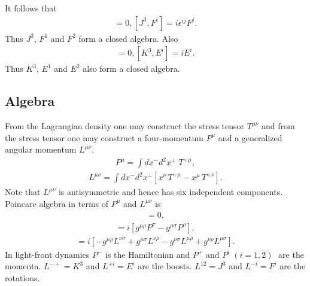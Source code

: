 \documentclass[12pt,a4paper]{report}
\begin{document}
It follows that
\begin{align}
    [ F^{1}, F^{2} ] = 0  , [J^{3},F^{i}] = i \epsilon^{ij} F^{j}  .
\end{align}
Thus $J^3$, $F^1$ and $F^2$ form a closed algebra. Also
\begin{align}
    [E^1,E^2]=0, [K^3,E^i] = i E^i.
\end{align}
Thus $K^3$, $E^1$ and $E^2$ also form a closed algebra.

\subsection{Algebra}
From the Lagrangian density one may construct the stress tensor $T^{\mu \nu}$ 
and from the
stress tensor one may construct a four-momentum $P^{\mu}$ and a generalized
angular momentum $L^{\mu \nu}$. \cite{Harindranath, Chang}
\begin{align}
P^{\mu} =  \int dx^{-} d^{2}x^{\perp} \; T^{+ \mu}  ,
\end{align}
 \begin{align}
 L^{\mu \nu} =  \int dx^{-} d^{2}x^{\perp} [ x^{\nu} \, T^{+\mu}
- x^{\mu} \, T^{+\nu} ]  . 
\end{align}
Note that $L^{\mu \nu}$ is antisymmetric and hence has six independent
components. 
Poincare algebra in terms of $P^{\mu}$ and $L^{\mu \nu}$ is 
\begin{align}
[ P^{\mu} , P^{\nu}] = 0  , 
\end{align}
\begin{align}
[ P^{\mu} , L^{\rho \sigma} ] = i [ g^{\mu \rho } P^{\sigma} 
- g^{\mu \sigma} P^{\rho}]  , 
\end{align}
\begin{align}
[ L^{\mu \nu} , L^{\rho \sigma}] = i [ - g^{\mu \rho} L^{\nu \sigma} +
g^{\mu \sigma} L^{\nu \rho}- g^{\nu \sigma} L^{\mu \rho} + g^{\nu \rho} L^{\mu
\sigma} ]  . 
\end{align}
\bigskip
In light-front dynamics $P^{-} $ is the Hamiltonian and $P^{+}$ and 
$P^{i} \; (i=1,2) \; $ 
\vspace{-0.3truecm}
are the momenta. $L^{-+} = K^{3}$ and $L^{+i} = E^{i}$  are
the boosts. $L^{12} = J^{3}$ and $L^{-i}= F^{i}$ are the rotations. 
\end{document}
